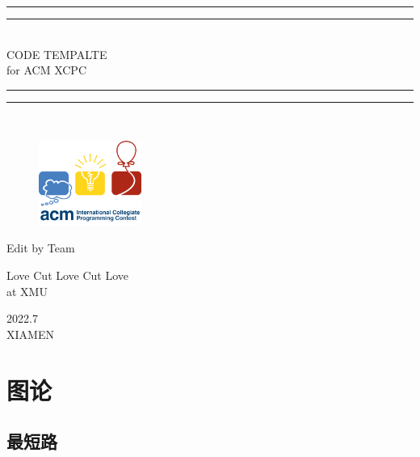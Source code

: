 \documentclass[a4paper,11pt,twoside,fontset = fandol,UTF8]{ctexbook}
\newcommand{\emptyPage}{\null\thispagestyle{empty}\addtocounter{page}{-1}\newpage}
\begin{document}
  \begin{titlepage}       %
    \centering
    \vspace*{\baselineskip}
    \rule{\textwidth}{1.6pt}
    \vspace*{-\baselineskip}
    \vspace*{2pt}
    \rule{\textwidth}{0.4pt}\\[\baselineskip]{\LARGE CODE TEMPALTE\\[\baselineskip]\small for ACM XCPC}
    \\[0.2\baselineskip]
    \rule{\textwidth}{0.4pt}\vspace*{-\baselineskip}\vspace{3.2pt}
    \rule{\textwidth}{1.6pt}\\[\baselineskip]
    \scshape

    \begin{figure}[!htb]
        \centering
        \includegraphics[width=0.3\textwidth]{icpc}    %
    \end{figure}

    \vspace*{3\baselineskip}
    Edit by Team\\
    [\baselineskip]
    {\Large {}  \par}
    {\Large Love Cut Love Cut Love \\ \normalsize{at XMU}\par}
    \vfill
    {\scshape 2022.7}\\{\large XIAMEN}\par
  \end{titlepage}

  \emptyPage

  \setcounter{page}{1}
  \tableofcontents


  \newpage
  \emptyPage

  \setcounter{page}{1}

  \chapter{图论}
  \setcounter{page}{1}
  \section{最短路}
\end{document}
